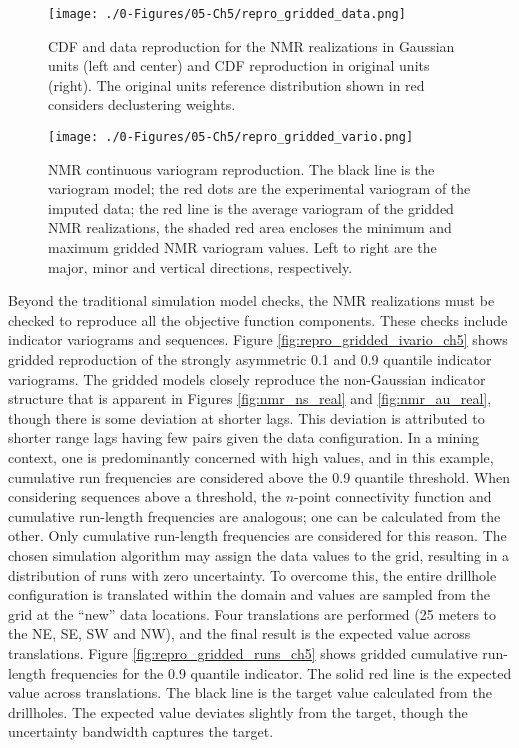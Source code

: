 \begin{figure}[htb!]
    \centering
    \texttt{[image: ./0-Figures/05-Ch5/repro\_gridded\_data.png]}
    \caption{\Gls{CDF} and data reproduction for the \gls{NMR} realizations in Gaussian units (left and center) and \gls{CDF} reproduction in original units (right). The original units reference distribution shown in red considers declustering weights.}
    \label{fig:repro_gridded_data_ch5}
\end{figure}

\begin{figure}[htb!]
    \centering
    \texttt{[image: ./0-Figures/05-Ch5/repro\_gridded\_vario.png]}
    \caption{\gls{NMR} continuous variogram reproduction. The black line is the variogram model; the red dots are the experimental variogram of the imputed data; the red line is the average variogram of the gridded \gls{NMR} realizations, the shaded red area encloses the minimum and maximum gridded \gls{NMR} variogram values. Left to right are the major, minor and vertical directions, respectively.}
    \label{fig:repro_gridded_vario_ch5}
\end{figure}

Beyond the traditional simulation model checks, the \gls{NMR} realizations must be checked to reproduce all the objective function components. These checks include indicator variograms and sequences. Figure \ref{fig:repro_gridded_ivario_ch5} shows gridded reproduction of the strongly asymmetric 0.1 and 0.9 quantile indicator variograms. The gridded models closely reproduce the non-Gaussian indicator structure that is apparent in Figures \ref{fig:nmr_ns_real} and \ref{fig:nmr_au_real}, though there is some deviation at shorter lags. This deviation is attributed to shorter range lags having few pairs given the data configuration. In a mining context, one is predominantly concerned with high values, and in this example, cumulative run frequencies are considered above the 0.9 quantile threshold. When considering sequences above a threshold, the $n$-point connectivity function and cumulative run-length frequencies are analogous; one can be calculated from the other. Only cumulative run-length frequencies are considered for this reason. The chosen simulation algorithm may assign the data values to the grid, resulting in a distribution of runs with zero uncertainty. To overcome this, the entire drillhole configuration is translated within the domain and values are sampled from the grid at the ``new'' data locations. Four translations are performed (25 meters to the NE, SE, SW and NW), and the final result is the expected value across translations. Figure \ref{fig:repro_gridded_runs_ch5} shows gridded cumulative run-length frequencies for the 0.9 quantile indicator. The solid red line is the expected value across translations. The black line is the target value calculated from the drillholes. The expected value deviates slightly from the target, though the uncertainty bandwidth captures the target.

